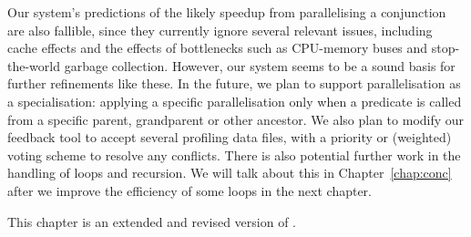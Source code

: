 Our system's predictions of the likely speedup from parallelising a conjunction
are also fallible, since they currently ignore several relevant issues,
including cache effects
and the effects of bottlenecks
such as CPU-memory buses and stop-the-world garbage collection.
However, our system seems to be a sound basis for further refinements like
these.
In the future, we plan to support parallelisation as a specialisation:
applying a specific parallelisation only when a predicate is called
from a specific parent, grandparent or other ancestor.
We also plan to modify our feedback tool
to accept several profiling data files,
with a priority or (weighted) voting scheme to resolve any conflicts.
There is also potential further work in the handling of loops and recursion.
We will talk about this in Chapter~\ref{chap:conc}
after we improve the efficiency of some loops in the next chapter.

This chapter is an extended and revised version of
\citet{bone:2011:overlap}.



